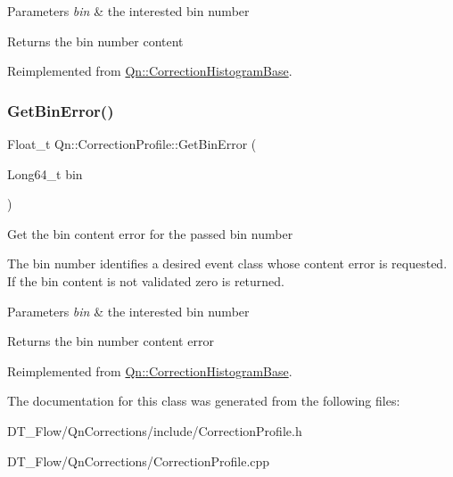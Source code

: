 \begin{DoxyParams}{Parameters}
{\em bin} & the interested bin number \\
\hline
\end{DoxyParams}
\begin{DoxyReturn}{Returns}
the bin number content 
\end{DoxyReturn}


Reimplemented from \mbox{\hyperlink{classQn_1_1CorrectionHistogramBase_a9e4e745a6f4cbebf5b9277d6d63bc9c7}{Qn\+::\+Correction\+Histogram\+Base}}.

\mbox{\label{classQn_1_1CorrectionProfile_a2253439bc16a7611449b07fcfced1b53}} 
\subsubsection{\texorpdfstring{Get\+Bin\+Error()}{GetBinError()}}
{\footnotesize\ttfamily Float\+\_\+t Qn\+::\+Correction\+Profile\+::\+Get\+Bin\+Error (\begin{DoxyParamCaption}\item[{Long64\+\_\+t}]{bin }\end{DoxyParamCaption})\hspace{0.3cm}{\ttfamily [virtual]}}

Get the bin content error for the passed bin number

The bin number identifies a desired event class whose content error is requested. If the bin content is not validated zero is returned.


\begin{DoxyParams}{Parameters}
{\em bin} & the interested bin number \\
\hline
\end{DoxyParams}
\begin{DoxyReturn}{Returns}
the bin number content error 
\end{DoxyReturn}


Reimplemented from \mbox{\hyperlink{classQn_1_1CorrectionHistogramBase_a50a7dd4c5bbe5e4d0e405365c2a9104d}{Qn\+::\+Correction\+Histogram\+Base}}.



The documentation for this class was generated from the following files\+:\begin{DoxyCompactItemize}
\item 
D\+T\+\_\+\+Flow/\+Qn\+Corrections/include/Correction\+Profile.\+h\item 
D\+T\+\_\+\+Flow/\+Qn\+Corrections/Correction\+Profile.\+cpp\end{DoxyCompactItemize}
